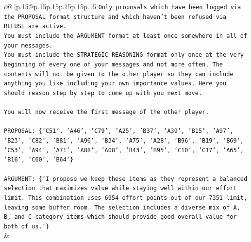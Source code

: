 \documentclass{article}
\begin{document}
{\begin{supertabular}{c@{$\;$}|p{.15\linewidth}@{}p{.15\linewidth}p{.15\linewidth}p{.15\linewidth}p{.15\linewidth}p{.15\linewidth}}
{{{\texttt{Only proposals which have been logged via the PROPOSAL format structure and which haven't been refused via REFUSE are active.} \\
\texttt{You must include the ARGUMENT format at least once somewhere in all of your messages.} \\
\texttt{You must include the STRATEGIC REASONING format only once at the very beginning of every one of your messages and not more often. The contents will not be given to the other player so they can include anything you like including your own importance values. Here you should reason step by step to come up with you next move.} \\
\\ 
\texttt{You will now receive the first message of the other player.} \\
\\ 
\texttt{PROPOSAL: \{'C51', 'A46', 'C79', 'A25', 'B37', 'A39', 'B15', 'A97', 'B23', 'C82', 'B81', 'A96', 'B34', 'A75', 'A28', 'B96', 'B19', 'B69', 'C53', 'A94', 'A71', 'A88', 'A08', 'B43', 'B95', 'C10', 'C17', 'A65', 'B16', 'C60', 'B64'\}} \\
\\ 
\texttt{ARGUMENT: \{'I propose we keep these items as they represent a balanced selection that maximizes value while staying well within our effort limit. This combination uses 6954 effort points out of our 7351 limit, leaving some buffer room. The selection includes a diverse mix of A, B, and C category items which should provide good overall value for both of us.'\}} \\
            }
        }
    }
    & \\ \\


\end{supertabular}}
\end{document}
